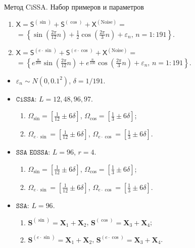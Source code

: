 \documentclass[notheorems, handout]{beamer}
\theoremstyle{definition}
\newcommand{\SSA}{\texttt{SSA}}
\newcommand{\EOSSA}{\texttt{SSA EOSSA}}
\newcommand{\CISSA}{\texttt{CiSSA}}
\newcommand{\TS}{\mathsf{X}}
\newcommand{\SIGNAL}{\mathsf{S}}
\begin{document}



\begin{frame}{Метод CiSSA. Набор примеров и параметров}
	\textbf{}
	\begin{enumerate}
		\item $\TS = \SIGNAL^{(\sin)} + \SIGNAL^{(\cos)} + \TS^{(\mathrm{Noise})} =$ $ = \left\{\sin(\frac{2\pi}{12} n ) + \frac{1}{2} \cos(\frac{2\pi}{3}  n ) + \varepsilon_n, \, n = 1:191\right\}$.
		\item $\TS = \SIGNAL^{(e \cdot \sin)} + \SIGNAL^{(e \cdot \cos)} + \TS^{(\mathrm{Noise})} =$ $ = \left\{e^{\frac{n}{200}} \sin(\frac{2\pi}{12} n ) + e^\frac{n}{100} \cos(\frac{2\pi}{3}  n ) + \varepsilon_n, \, n = 1:191\right\}$.
	\end{enumerate}
	
	\textbf{}
	\begin{itemize}
		\item $\varepsilon_n \sim N(0, 0.1^2)$, $\delta = 1/191$.
		\item $\CISSA$: $L = 12, 48, 96, 97$.
		\begin{enumerate}
			\item $\Omega_{\sin} = \left[\frac{1}{12} \pm 6 \delta\right]$, $\Omega_{\cos} = \left[\frac{1}{3} \pm 6 \delta\right]$;
			\item $\Omega_{e \cdot \sin} = \left[\frac{1}{12} \pm 6 \delta\right]$, $\Omega_{e \cdot \cos} = \left[\frac{1}{3} \pm 6 \delta\right]$.
		\end{enumerate}
		\item $\EOSSA$: $L = 96$, $r = 4$.
		\begin{enumerate}
			\item $\Omega_{\sin} = \left[\frac{1}{12} \pm 6 \delta\right]$, $\Omega_{\cos} = \left[\frac{1}{3} \pm 6 \delta\right]$;
			\item $\Omega_{e \cdot \sin} = \left[\frac{1}{12} \pm 6 \delta\right]$, $\Omega_{e \cdot \cos} = \left[\frac{1}{3} \pm 6 \delta\right]$.
		\end{enumerate}
		\item $\SSA$: $L = 96$.
		\begin{enumerate}
			\item $\mathbf S^{(\sin)} = \mathbf X_1 + \mathbf X_2$, $\mathbf S^{(\cos)} = \mathbf X_3 + \mathbf X_4$;
			\item $\mathbf S^{(e \cdot \sin)} = \mathbf X_1 + \mathbf X_2$, $\mathbf S^{(e \cdot \cos)} = \mathbf X_3 + \mathbf X_4$.
		\end{enumerate}
	\end{itemize}
\end{frame}
\end{document}
